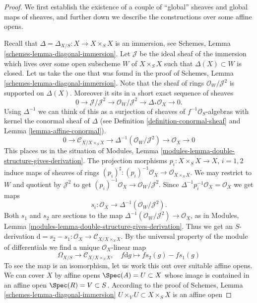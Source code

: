 \begin{proof}
We first establish the existence of a couple of ``global'' sheaves
and global maps of sheaves, and further down we describe
the constructions over some affine opens.

\medskip\noindent
Recall that $\Delta = \Delta_{X/S} : X \to X \times_S X$
is an immersion, see Schemes, Lemma \ref{schemes-lemma-diagonal-immersion}.
Let $\mathcal{J}$ be the ideal sheaf of the immersion
which lives over some open subscheme $W$ of $X \times_S X$
such that $\Delta(X) \subset W$ is closed. Let us take the one that
was found in the proof of
Schemes, Lemma \ref{schemes-lemma-diagonal-immersion}.
Note that the sheaf of rings $\mathcal{O}_W/\mathcal{J}^2$
is supported on $\Delta(X)$. Moreover it sits in a
short exact sequence of sheaves
$$
0 \to \mathcal{J}/\mathcal{J}^2
\to \mathcal{O}_W/\mathcal{J}^2
\to \Delta_*\mathcal{O}_X
\to 0.
$$
Using $\Delta^{-1}$ we can think of this as a surjection of
sheaves of $f^{-1}\mathcal{O}_S$-algebras with kernel the
conormal sheaf of $\Delta$ (see Definition \ref{definition-conormal-sheaf}
and Lemma \ref{lemma-affine-conormal}).
$$
0 \to \mathcal{C}_{X/X \times_S X}
\to \Delta^{-1}(\mathcal{O}_W/\mathcal{J}^2)
\to \mathcal{O}_X
\to 0
$$
This places us in the situation of
Modules, Lemma \ref{modules-lemma-double-structure-gives-derivation}.
The projection morphisms $p_i : X \times_S X \to X$, $i = 1, 2$ induce
maps of sheaves of rings
$(p_i)^\sharp : (p_i)^{-1}\mathcal{O}_X \to \mathcal{O}_{X \times_S X}$.
We may restrict to $W$ and quotient by $\mathcal{J}^2$ to get
$(p_i)^{-1}\mathcal{O}_X \to \mathcal{O}_W/\mathcal{J}^2$.
Since $\Delta^{-1}p_i^{-1}\mathcal{O}_X = \mathcal{O}_X$
we get maps
$$
s_i : \mathcal{O}_X \to \Delta^{-1}(\mathcal{O}_W/\mathcal{J}^2).
$$
Both $s_1$ and $s_2$ are sections to the map
$\Delta^{-1}(\mathcal{O}_W/\mathcal{J}^2) \to \mathcal{O}_X$,
as in Modules, Lemma \ref{modules-lemma-double-structure-gives-derivation}.
Thus we get an $S$-derivation
$\text{d} = s_2 - s_1 : \mathcal{O}_X \to \mathcal{C}_{X/X \times_S X}$.
By the universal property of the module of differentials we find a
unique $\mathcal{O}_X$-linear map
$$
\Omega_{X/S} \longrightarrow \mathcal{C}_{X/X \times_S X},\quad
f\text{d}g \longmapsto fs_2(g) - fs_1(g)
$$
To see the map is an isomorphism, let us work this out over suitable affine
opens. We can cover $X$ by affine opens $\Spec(A) = U \subset X$
whose image is contained in an affine open $\Spec(R) = V \subset S$.
According to the proof of Schemes, Lemma \ref{schemes-lemma-diagonal-immersion}
$U \times_V U \subset X \times_S X$ is an affine open

\end{proof}
